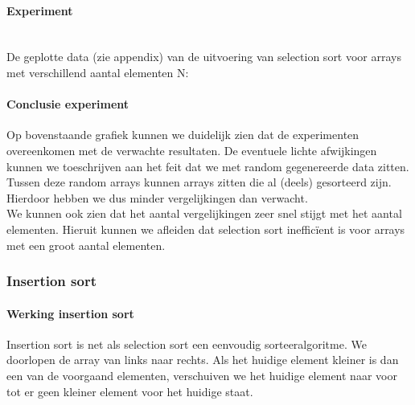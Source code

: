 \documentclass[11pt, a4paper]{article}
\begin{document}
\paragraph{Experiment}\hspace{0pt}\\
De geplotte data (zie appendix) van de uitvoering van selection sort voor arrays met verschillend aantal elementen N:\\
\paragraph{Conclusie experiment} Op bovenstaande grafiek kunnen we duidelijk zien dat de experimenten overeenkomen met de verwachte resultaten. De eventuele lichte afwijkingen kunnen we toeschrijven aan het feit dat we met random gegenereerde data zitten. Tussen deze random arrays kunnen arrays zitten die al (deels) gesorteerd zijn. Hierdoor hebben we dus minder vergelijkingen dan verwacht.\\
\indent We kunnen ook zien dat het aantal vergelijkingen zeer snel stijgt met het aantal elementen. Hieruit kunnen we afleiden dat selection sort ineffic\"ient is voor arrays met een groot aantal elementen.

\newpage
\subsubsection*{Insertion sort}
\paragraph{Werking insertion sort} Insertion sort is net als selection sort een eenvoudig sorteeralgoritme. We doorlopen de array van links naar rechts. Als het huidige element kleiner is dan een van de voorgaand elementen, verschuiven we het huidige element naar voor tot er geen kleiner element voor het huidige staat.
\end{document}
